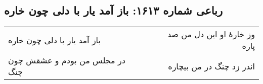 \begin{center}
\section*{رباعی شماره ۱۶۱۳: باز آمد یار با دلی چون خاره}
\label{sec:1613}
\begin{longtable}{l p{0.5cm} r}
باز آمد یار با دلی چون خاره
&&
وز خارهٔ او این دل من صد پاره
\\
در مجلس من بودم و عشقش چون چنگ
&&
اندر زد چنگ در من بیچاره
\\
\end{longtable}
\end{center}
